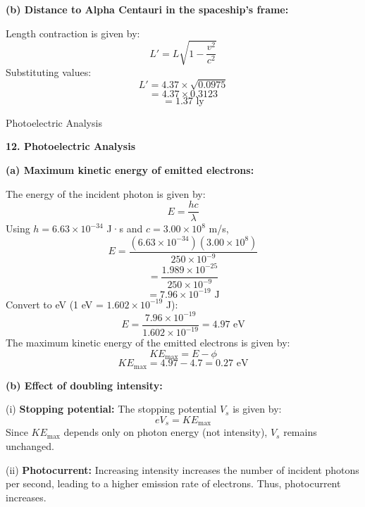 \documentclass[addpoints]{exam}
\begin{document}
\begin{questions}
\begin{solution}
\textbf{(b) Distance to Alpha Centauri in the spaceship’s frame:}  

Length contraction is given by:  
\[
L' = L \sqrt{1 - \frac{v^2}{c^2}}
\]
Substituting values:  
\[
L' = 4.37 \times \sqrt{0.0975}
\]
\[
= 4.37 \times 0.3123
\]
\[
= 1.37 \text{ ly}
\]
\end{solution}


\question Photoelectric Analysis
\begin{solution}
\textbf{12. Photoelectric Analysis}  

\textbf{(a) Maximum kinetic energy of emitted electrons:}  

The energy of the incident photon is given by:  
\[
E = \frac{hc}{\lambda}
\]
Using \( h = 6.63 \times 10^{-34} \) J·s and \( c = 3.00 \times 10^8 \) m/s,  
\[
E = \frac{(6.63 \times 10^{-34}) (3.00 \times 10^8)}{250 \times 10^{-9}}
\]
\[
= \frac{1.989 \times 10^{-25}}{250 \times 10^{-9}}
\]
\[
= 7.96 \times 10^{-19} \text{ J}
\]
Convert to eV (1 eV = \(1.602 \times 10^{-19}\) J):  
\[
E = \frac{7.96 \times 10^{-19}}{1.602 \times 10^{-19}} = 4.97 \text{ eV}
\]
The maximum kinetic energy of the emitted electrons is given by:  
\[
KE_{\max} = E - \phi
\]
\[
KE_{\max} = 4.97 - 4.7 = 0.27 \text{ eV}
\]

\textbf{(b) Effect of doubling intensity:}  

(i) \textbf{Stopping potential:}  
The stopping potential \( V_s \) is given by:  
\[
eV_s = KE_{\max}
\]
Since \( KE_{\max} \) depends only on photon energy (not intensity), \( V_s \) remains unchanged.  

(ii) \textbf{Photocurrent:}  
Increasing intensity increases the number of incident photons per second, leading to a higher emission rate of electrons. Thus, photocurrent increases.  

\end{solution}


\end{questions}
\end{document}
